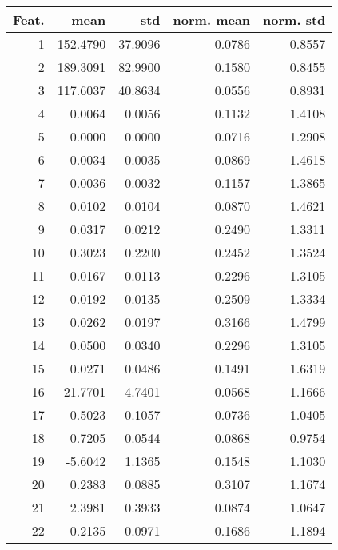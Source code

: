 \begin{tabular}{rrrrr}
\toprule
 Feat. &      mean &      std &  norm. mean &  norm. std \\
\midrule
     1 &  152.4790 &  37.9096 &      0.0786 &     0.8557 \\
     2 &  189.3091 &  82.9900 &      0.1580 &     0.8455 \\
     3 &  117.6037 &  40.8634 &      0.0556 &     0.8931 \\
     4 &    0.0064 &   0.0056 &      0.1132 &     1.4108 \\
     5 &    0.0000 &   0.0000 &      0.0716 &     1.2908 \\
     6 &    0.0034 &   0.0035 &      0.0869 &     1.4618 \\
     7 &    0.0036 &   0.0032 &      0.1157 &     1.3865 \\
     8 &    0.0102 &   0.0104 &      0.0870 &     1.4621 \\
     9 &    0.0317 &   0.0212 &      0.2490 &     1.3311 \\
    10 &    0.3023 &   0.2200 &      0.2452 &     1.3524 \\
    11 &    0.0167 &   0.0113 &      0.2296 &     1.3105 \\
    12 &    0.0192 &   0.0135 &      0.2509 &     1.3334 \\
    13 &    0.0262 &   0.0197 &      0.3166 &     1.4799 \\
    14 &    0.0500 &   0.0340 &      0.2296 &     1.3105 \\
    15 &    0.0271 &   0.0486 &      0.1491 &     1.6319 \\
    16 &   21.7701 &   4.7401 &      0.0568 &     1.1666 \\
    17 &    0.5023 &   0.1057 &      0.0736 &     1.0405 \\
    18 &    0.7205 &   0.0544 &      0.0868 &     0.9754 \\
    19 &   -5.6042 &   1.1365 &      0.1548 &     1.1030 \\
    20 &    0.2383 &   0.0885 &      0.3107 &     1.1674 \\
    21 &    2.3981 &   0.3933 &      0.0874 &     1.0647 \\
    22 &    0.2135 &   0.0971 &      0.1686 &     1.1894 \\
\bottomrule
\end{tabular}
